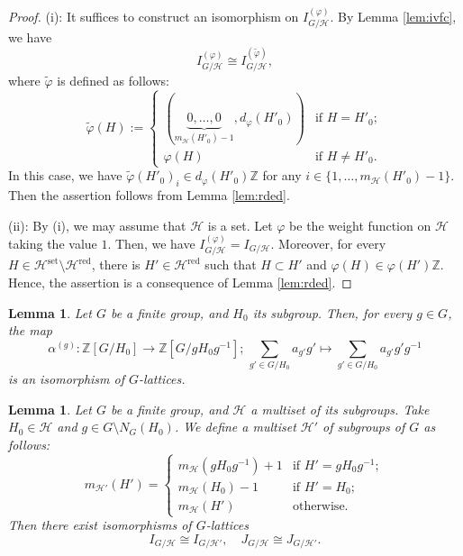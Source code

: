 \documentclass[12pt]{amsart}
\theoremstyle{plain}
\newtheorem{lem}[thm]{Lemma}
\theoremstyle{definition}
\numberwithin{thm}{section}
\numberwithin{equation}{section}
\newcommand{\Z}{\mathbb{Z}}
\newcommand{\cH}{\mathcal{H}}
\DeclareMathOperator{\red}{red}
\DeclareMathOperator{\set}{set}
\begin{document}
\begin{proof}
(i): It suffices to construct an isomorphism on $I_{G/\cH}^{(\varphi)}$. By Lemma \ref{lem:ivfc}, we have
\begin{equation*}
    I_{G/\cH}^{(\varphi)} \cong I_{G/\cH}^{(\widetilde{\varphi})},
\end{equation*}
where $\widetilde{\varphi}$ is defined as follows: 
\begin{equation*}
    \widetilde{\varphi}(H):=
    \begin{cases}
        (\underbrace{0,\ldots,0}_{m_{\cH}(H'_{0})-1},d_{\varphi}(H'_{0}))&\text{if }H=H'_{0};\\
        \varphi(H)&\text{if }H\neq H'_{0}. 
    \end{cases}
\end{equation*}
In this case, we have ${\widetilde{\varphi}}(H'_{0})_{i}\in {d}_{\varphi}(H'_{0})\Z$ for any $i\in \{1,\ldots,m_{\cH}(H'_{0})-1\}$. Then the assertion follows from Lemma \ref{lem:rded}. 

(ii): By (i), we may assume that $\cH$ is a set. Let $\varphi$ be the weight function on $\cH$ taking the value $1$. Then, we have $I_{G/\cH}^{(\varphi)}=I_{G/\cH}$. Moreover, for every $H\in \cH^{\set}\setminus \cH^{\red}$, there is $H'\in \cH^{\red}$ such that $H\subset H'$ and $\varphi(H)\in \varphi(H')\Z$. Hence, the assertion is a consequence of Lemma \ref{lem:rded}. 
\end{proof}

\begin{lem}\label{lem:cjpm}
Let $G$ be a finite group, and $H_{0}$ its subgroup. Then, for every $g\in G$, the map
\begin{equation*}
\alpha^{(g)}\colon \Z[G/H_{0}]\rightarrow \Z[G/gH_{0}g^{-1}];\,\sum_{g' \in G/H_{0}}a_{g'}g' \mapsto \sum_{g' \in G/H_{0}}a_{g'}g'g^{-1}
\end{equation*}
is an isomorphism of $G$-lattices. 
\end{lem}

\begin{lem}\label{lem:conj}
Let $G$ be a finite group, and $\cH$ a multiset of its subgroups. Take $H_{0}\in \cH$ and $g\in G\setminus N_{G}(H_{0})$. We define a multiset $\cH'$ of subgroups of $G$ as follows: 
\begin{equation*}
m_{\cH'}(H')=
\begin{cases}
m_{\cH}(gH_{0}g^{-1})+1&\text{if }H'=gH_{0}g^{-1}; \\
m_{\cH}(H_{0})-1&\text{if }H'=H_{0};\\
m_{\cH}(H')&\text{otherwise}. 
\end{cases}
\end{equation*}
Then there exist isomorphisms of $G$-lattices
\begin{equation*}
    I_{G/\cH}\cong I_{G/\cH'},\quad J_{G/\cH}\cong J_{G/\cH'}. 
\end{equation*}
\end{lem}
\end{document}

